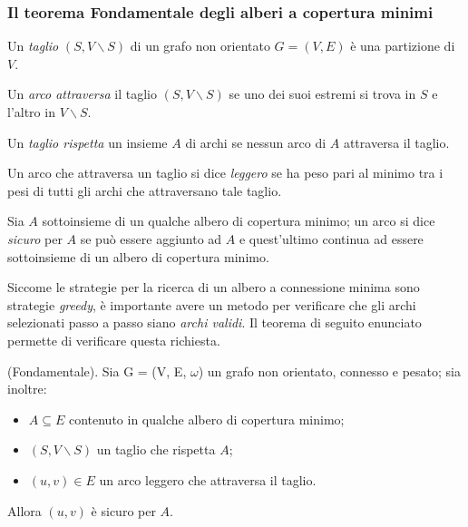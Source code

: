 \subsubsection{Il teorema Fondamentale degli alberi a copertura minimi \cite{cormen}}\label{subsubsec:th_mst}
\begin{defn}
Un \emph{taglio} $(S,V\backslash S)$ di un grafo non orientato $G = (V, E)$ è una partizione di $V$.
\end{defn}
\begin{defn}
Un \emph{arco attraversa} il taglio $(S,V\backslash S)$ se uno dei suoi estremi si trova in $S$ e l’altro in $V\backslash S$.
\end{defn}
\begin{defn}
	Un \emph{taglio rispetta} un insieme $A$ di archi se nessun arco di $A$ attraversa il taglio.
\end{defn}
\begin{defn}
	Un arco che attraversa un taglio si dice \emph{leggero} se ha peso pari al minimo tra i pesi di tutti gli archi che attraversano tale taglio.
\end{defn}
\begin{defn}
	Sia $A$ sottoinsieme di un qualche albero di copertura minimo; un arco si dice \emph{sicuro} per $A$ se può essere aggiunto ad $A$ e quest'ultimo continua ad essere sottoinsieme di un albero di copertura minimo.
\end{defn}
Siccome le strategie per la ricerca di un albero a connessione minima sono strategie \textit{greedy}, è importante avere un metodo per verificare che gli archi selezionati passo a passo siano \emph{archi validi}. Il teorema di seguito enunciato permette di verificare questa richiesta.
\begin{thm}(Fondamentale). Sia G = (V, E, $\omega$) un grafo non orientato, connesso e pesato; sia inoltre:
	\begin{itemize}
	\item $A \subseteq E$ contenuto in qualche albero di copertura minimo;
	\item $(S,V\backslash S)$ un taglio che rispetta $A$;
    \item $(u, v) \in E$ un arco leggero che attraversa il taglio. 
	\end{itemize}
Allora $(u, v)$ è sicuro per $A$.
\end{thm}

